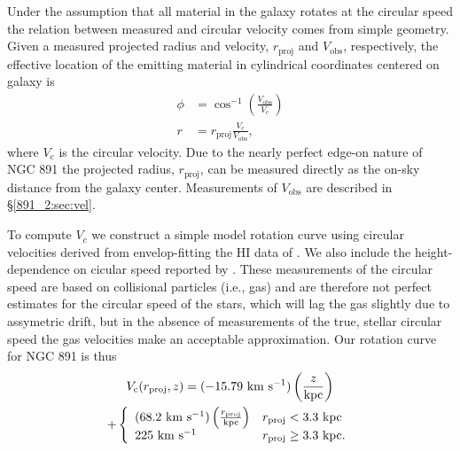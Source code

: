 Under the assumption that all material in the galaxy rotates at the
circular speed the relation between measured and circular velocity
comes from simple geometry. Given a measured projected radius and
velocity, $r_{\mathrm{proj}}$ and $V_{\mathrm{obs}}$, respectively,
the effective location of the emitting material in cylindrical
coordinates centered on galaxy is
\begin{align}
  \label{891_2:eq:vel_LOS}
  \phi &= \cos^{-1}\left(\frac{V_{\mathrm{obs}}}{V_{\mathrm{c}}}\right)\\
  r &= r_{\mathrm{proj}}\frac{V_{\mathrm{c}}}{V_{\mathrm{obs}}},
\end{align}
where $V_{\mathrm{c}}$ is the circular velocity. Due to the nearly
perfect edge-on nature of NGC 891 the projected radius,
$r_\mathrm{proj}$, can be measured directly as the on-sky distance
from the galaxy center. Measurements of $V_\mathrm{obs}$ are described
in \S\ref{891_2:sec:vel}.

To compute $V_c$ we construct a simple model rotation curve using
circular velocities derived from envelop-fitting the HI data of
\citet{Swaters97}. We also include the height-dependence on cicular
speed reported by \citet{Oosterloo07}. These measurements of the
circular speed are based on collisional particles (i.e., gas) and are
therefore not perfect estimates for the circular speed of the stars,
which will lag the gas slightly due to assymetric drift, but in the
absence of measurements of the true, stellar circular speed the gas
velocities make an acceptable approximation. Our rotation curve for
NGC 891 is thus
\begin{multline}
  V_{\mathrm{c}}(r_{\mathrm{proj}},z) =
  (-15.79~\mathrm{\mathrm{km\ s^{-1}}} )\left(\frac{z}{\mathrm{kpc}}\right) \\ 
  + \left\{
    \begin{array}{ll}
      (68.2~\mathrm{\mathrm{km\ s^{-1}}} )\left(\frac{r_{\mathrm{proj}}}{\mathrm{kpc}}\right)
      & r_{\mathrm{proj}} < 3.3~\mathrm{kpc} \\ 225~\mathrm{\mathrm{km\ s^{-1}}}  &
      r_{\mathrm{proj}} \geq 3.3~\mathrm{kpc} .\\
    \end{array}
    \right.
\end{multline}

